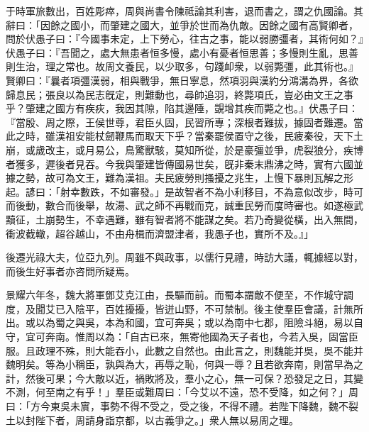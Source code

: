 \begin{pinyinscope}
 
 于時軍旅數出，百姓彫瘁，周與尚書令陳祗論其利害，退而書之，謂之仇國論。其辭曰：「因餘之國小，而肇建之國大，並爭於世而為仇敵。因餘之國有高賢卿者，問於伏愚子曰：『今國事未定，上下勞心，往古之事，能以弱勝彊者，其術何如？』伏愚子曰：『吾聞之，處大無患者恒多慢，處小有憂者恒思善；多慢則生亂，思善則生治，理之常也。故周文養民，以少取多，句踐卹衆，以弱斃彊，此其術也。』賢卿曰：『曩者項彊漢弱，相與戰爭，無日寧息，然項羽與漢約分鴻溝為界，各欲歸息民；張良以為民志旣定，則難動也，尋帥追羽，終斃項氏，豈必由文王之事乎？肇建之國方有疾疢，我因其隙，陷其邊陲，覬增其疾而斃之也。』伏愚子曰：『當殷、周之際，王侯世尊，君臣乆固，民習所專；深根者難拔，據固者難遷。當此之時，雖漢祖安能杖劒鞭馬而取天下乎？當秦罷侯置守之後，民疲秦役，天下土崩，或歲改主，或月易公，鳥驚獸駭，莫知所從，於是豪彊並爭，虎裂狼分，疾博者獲多，遲後者見吞。今我與肇建皆傳國易世矣，旣非秦末鼎沸之時，實有六國並據之勢，故可為文王，難為漢祖。夫民疲勞則搔擾之兆生，上慢下暴則瓦解之形起。諺曰：「射幸數跌，不如審發。」是故智者不為小利移目，不為意似改步，時可而後動，數合而後舉，故湯、武之師不再戰而克，誠重民勞而度時審也。如遂極武黷征，土崩勢生，不幸遇難，雖有智者將不能謀之矣。若乃奇變從橫，出入無間，衝波截轍，超谷越山，不由舟楫而濟盟津者，我愚子也，實所不及。』」
 
 
 
 
 後遷光祿大夫，位亞九列。周雖不與政事，以儒行見禮，時訪大議，輒據經以對，而後生好事者亦咨問所疑焉。
 
 
 
 
 景耀六年冬，魏大將軍鄧艾克江由，長驅而前。而蜀本謂敵不便至，不作城守調度，及聞艾已入陰平，百姓擾擾，皆迸山野，不可禁制。後主使羣臣會議，計無所出。或以為蜀之與吳，本為和國，宜可奔吳；或以為南中七郡，阻險斗絕，易以自守，宜可奔南。惟周以為：「自古已來，無寄他國為天子者也，今若入吳，固當臣服。且政理不殊，則大能吞小，此數之自然也。由此言之，則魏能并吳，吳不能并魏明矣。等為小稱臣，孰與為大，再辱之恥，何與一辱？且若欲奔南，則當早為之計，然後可果；今大敵以近，禍敗將及，羣小之心，無一可保？恐發足之日，其變不測，何至南之有乎！」羣臣或難周曰：「今艾以不遠，恐不受降，如之何？」周曰：「方今東吳未賔，事勢不得不受之，受之後，不得不禮。若陛下降魏，魏不裂土以封陛下者，周請身詣京都，以古義爭之。」衆人無以易周之理。
 

\end{pinyinscope}

